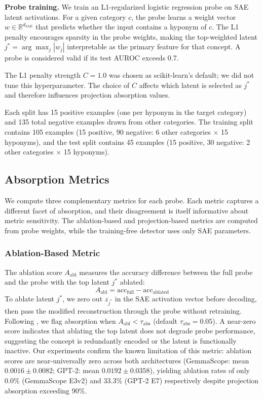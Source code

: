 \documentclass{article}
\begin{document}
\textbf{Probe training.} We train an L1-regularized logistic regression probe on SAE latent activations. For a given category $c$, the probe learns a weight vector $w \in \mathbb{R}^{d_{\text{SAE}}}$ that predicts whether the input contains a hyponym of $c$. The L1 penalty encourages sparsity in the probe weights, making the top-weighted latent $j^* = \arg\max_j |w_j|$ interpretable as the primary feature for that concept. A probe is considered valid if its test AUROC exceeds 0.7.

The L1 penalty strength $C=1.0$ was chosen as scikit-learn's default; we did not tune this hyperparameter. The choice of $C$ affects which latent is selected as $j^*$ and therefore influences projection absorption values.

Each split has 15 positive examples (one per hyponym in the target category) and 135 total negative examples drawn from other categories. The training split contains 105 examples (15 positive, 90 negative: 6 other categories $\times$ 15 hyponyms), and the test split contains 45 examples (15 positive, 30 negative: 2 other categories $\times$ 15 hyponyms).

\subsection{Absorption Metrics}
\label{sec:metrics}

We compute three complementary metrics for each probe. Each metric captures a different facet of absorption, and their disagreement is itself informative about metric sensitivity. The ablation-based and projection-based metrics are computed from probe weights, while the training-free detector uses only SAE parameters.

\subsubsection{Ablation-Based Metric}

The ablation score $A_{\text{abl}}$ measures the accuracy difference between the full probe and the probe with the top latent $j^*$ ablated:
\begin{equation}
A_{\text{abl}} = \text{acc}_{\text{full}} - \text{acc}_{\text{ablated}}
\end{equation}
To ablate latent $j^*$, we zero out $z_{j^*}$ in the SAE activation vector before decoding, then pass the modified reconstruction through the probe without retraining. Following \citet{chanin2024feature}, we flag absorption when $A_{\text{abl}} < \tau_{\text{abs}}$ (default $\tau_{\text{abs}} = 0.05$). A near-zero score indicates that ablating the top latent does not degrade probe performance, suggesting the concept is redundantly encoded or the latent is functionally inactive. Our experiments confirm the known limitation of this metric: ablation scores are near-universally zero across both architectures (GemmaScope: mean $0.0016 \pm 0.0082$; GPT-2: mean $0.0192 \pm 0.0358$), yielding ablation rates of only 0.0\% (GemmaScope E3v2) and 33.3\% (GPT-2 E7) respectively despite projection absorption exceeding 90\%.
\end{document}
